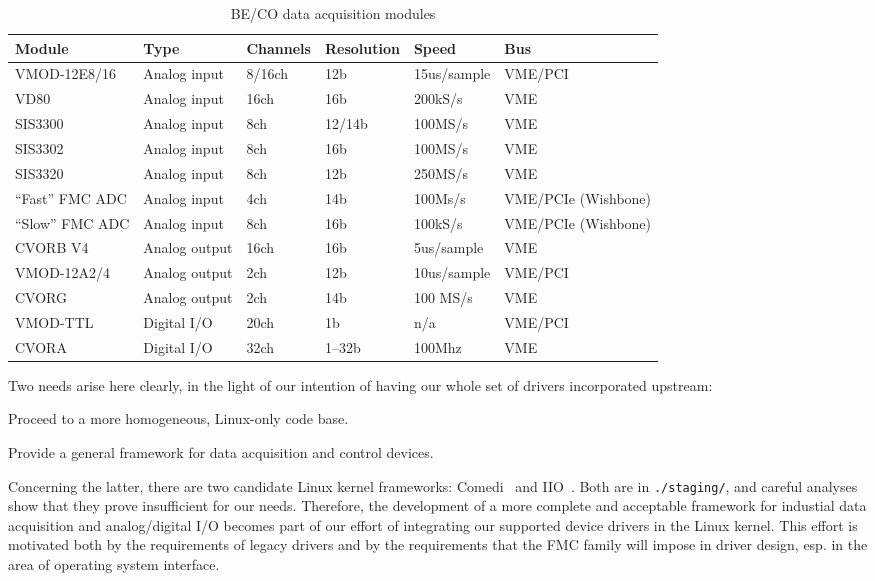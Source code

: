 \documentclass{JAC2003}
\begin{document}
\begin{table*}[ht]
   \centering
   \caption{BE/CO data acquisition modules}
   \begin{tabular}{llllll}
       \toprule
	\textbf{Module}& \textbf{Type}& \textbf{Channels}&
	\textbf{Resolution}& \textbf{Speed}& \textbf{Bus} \\
       \midrule
	VMOD-12E8/16    &  Analog input  & 8/16ch & 12b    & 15us/sample & VME/PCI  \\
	VD80            &  Analog input  & 16ch   & 16b    & 200kS/s     & VME  \\
	SIS3300         &  Analog input  & 8ch    & 12/14b & 100MS/s     & VME  \\
	SIS3302         &  Analog input  & 8ch    & 16b    & 100MS/s     & VME  \\
	SIS3320         &  Analog input  & 8ch    & 12b    & 250MS/s     & VME  \\
	``Fast'' FMC ADC&  Analog input  & 4ch    & 14b    & 100Ms/s     & VME/PCIe (Wishbone)  \\
	``Slow'' FMC ADC&  Analog input  & 8ch    & 16b    & 100kS/s     & VME/PCIe (Wishbone)  \\
       \midrule
	CVORB V4        &  Analog output & 16ch   &  16b   &  5us/sample & VME 	 \\
	VMOD-12A2/4     &  Analog output & 2ch    &  12b   &  10us/sample& VME/PCI \\
	CVORG           &  Analog output & 2ch    &  14b   &  100 MS/s   & VME  \\
       \midrule
	VMOD-TTL        &  Digital I/O   & 20ch   & 1b     & n/a         & VME/PCI \\
	CVORA           &  Digital I/O   & 32ch   & 1--32b & 100Mhz	 & VME \\
       \bottomrule
   \end{tabular}
   \label{zio-modules}
\end{table*}

Two needs arise here clearly, in the light of our intention of having
our whole set of drivers incorporated upstream:
\begin{Itemize}
\item Proceed to a more homogeneous, Linux-only code base.
\item Provide a general framework for data acquisition and control
    devices.
\end{Itemize}
Concerning the latter,
there are two candidate Linux kernel frameworks:
Comedi~\cite{comedi} and IIO~\cite{iio}. Both are in
\texttt{./staging/}, and careful analyses show that they prove
insufficient for our needs. Therefore, the development of a more complete and
acceptable framework for industial data acquisition and analog/digital
I/O becomes part of our effort of integrating our supported
device drivers in the Linux kernel. This effort is motivated both by the
requirements of legacy drivers and by the requirements that the FMC
family will impose in driver design, esp. in the area of operating
system interface.
\end{document}
